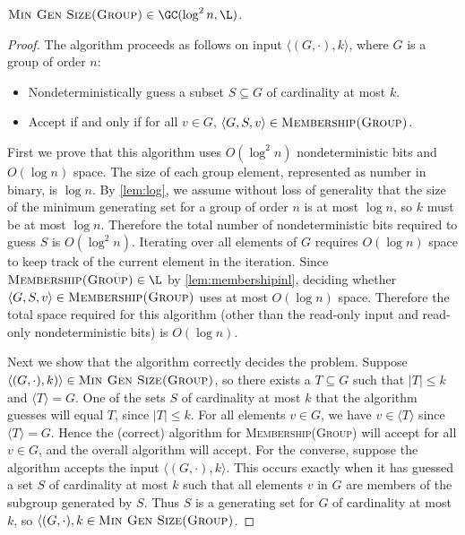 \documentclass{article}
\newcommand{\gen}[1]{{\langle #1 \rangle}}
\begin{document}
\begin{theorem}\label{thm:mingengc}
  $\textsc{Min Gen Size(Group)} \in \GC(\log^2 n, \L)$.
\end{theorem}
\begin{proof}
  The algorithm proceeds as follows on input $\langle (G, \cdot), k \rangle$, where $G$ is a group of order $n$:
  \begin{itemize}
  \item Nondeterministically guess a subset $S \subseteq G$ of cardinality at most $k$.
  \item Accept if and only if for all $v \in G$, $\langle G, S, v \rangle \in \textsc{Membership(Group)}$.
  \end{itemize}

  First we prove that this algorithm uses $O(\log^2 n)$ nondeterministic bits and $O(\log n)$ space.
  The size of each group element, represented as number in binary, is $\log n$.
  By \autoref{lem:log}, we assume without loss of generality that the size of the minimum generating set for a group of order $n$ is at most $\log n$, so $k$ must be at most $\log n$.
  Therefore the total number of nondeterministic bits required to guess $S$ is $O(\log^2 n)$.
  Iterating over all elements of $G$ requires $O(\log n)$ space to keep track of the current element in the iteration.
  Since $\textsc{Membership(Group)} \in \L$ by \autoref{lem:membershipinl}, deciding whether $\langle G, S, v \rangle \in \textsc{Membership(Group)}$ uses at most $O(\log n)$ space.
  Therefore the total space required for this algorithm (other than the read-only input and read-only nondeterministic bits) is $O(\log n)$.

  Next we show that the algorithm correctly decides the problem.
  Suppose $\langle (G, \cdot), k) \rangle \in \textsc{Min Gen Size(Group)}$, so there exists a $T \subseteq G$ such that $|T| \leq k$ and $\gen{T} = G$.
  One of the sets $S$ of cardinality at most $k$ that the algorithm guesses will equal $T$, since $|T| \leq k$.
  For all elements $v \in G$, we have $v \in \gen{T}$ since $\gen{T} = G$.
  Hence the (correct) algorithm for \textsc{Membership(Group)} will accept for all $v \in G$, and the overall algorithm will accept.
  For the converse, suppose the algorithm accepts the input $\langle (G, \cdot), k \rangle$.
  This occurs exactly when it has guessed a set $S$ of cardinality at most $k$ such that all elements $v$ in $G$ are members of the subgroup generated by $S$.
  Thus $S$ is a generating set for $G$ of cardinality at most $k$, so $\langle (G, \cdot), k \in \textsc{Min Gen Size(Group)}$.
\end{proof}
\end{document}
